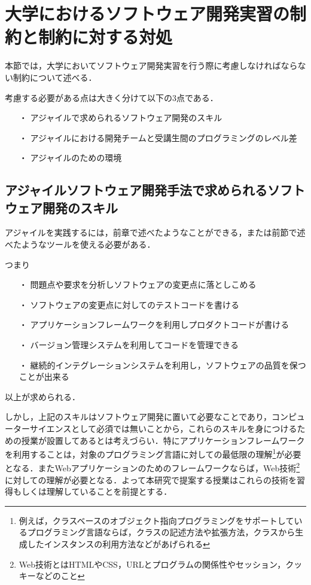 \section{大学におけるソフトウェア開発実習の制約と制約に対する対処}

本節では，大学においてソフトウェア開発実習を行う際に考慮しなければならない制約について述べる．

考慮する必要がある点は大きく分けて以下の3点である．

\begin{itemize}
\item[・] アジャイルで求められるソフトウェア開発のスキル
\item[・] アジャイルにおける開発チームと受講生間のプログラミングのレベル差
\item[・] アジャイルのための環境
\end{itemize}

\subsection{アジャイルソフトウェア開発手法で求められるソフトウェア開発のスキル}

アジャイルを実践するには，前章で述べたようなことができる，または前節で述べたようなツールを使える必要がある．

つまり

\begin{itemize}
\item[・]問題点や要求を分析しソフトウェアの変更点に落としこめる
\item[・]ソフトウェアの変更点に対してのテストコードを書ける
\item[・]アプリケーションフレームワークを利用しプロダクトコードが書ける
\item[・]バージョン管理システムを利用してコードを管理できる
\item[・]継続的インテグレーションシステムを利用し，ソフトウェアの品質を保つことが出来る
\end{itemize}

以上が求められる．

しかし，上記のスキルはソフトウェア開発に置いて必要なことであり，コンピューターサイエンスとして必須では無いことから，これらのスキルを身につけるための授業が設置してあるとは考えづらい．特にアプリケーションフレームワークを利用することは，対象のプログラミング言語に対しての最低限の理解\footnote{例えば，クラスベースのオブジェクト指向プログラミングをサポートしているプログラミング言語ならば，クラスの記述方法や拡張方法，クラスから生成したインスタンスの利用方法などがあげられる}が必要となる．またWebアプリケーションのためのフレームワークならば，Web技術\footnote{Web技術とはHTMLやCSS，URLとプログラムの関係性やセッション，クッキーなどのこと}に対しての理解が必要となる．よって本研究で提案する授業はこれらの技術を習得もしくは理解していることを前提とする．


